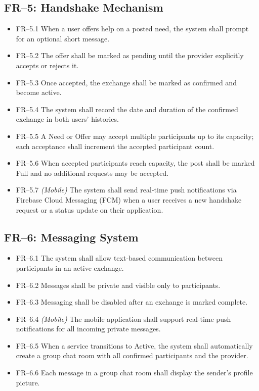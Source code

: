 \documentclass[11pt,a4paper]{report}
\begin{document}
\subsection{FR--5: Handshake Mechanism}
\begin{itemize}
    \item FR--5.1 When a user offers help on a posted need, the system shall prompt for an optional short message.
    \item FR--5.2 The offer shall be marked as pending until the provider explicitly accepts or rejects it.
    \item FR--5.3 Once accepted, the exchange shall be marked as confirmed and become active.
    \item FR--5.4 The system shall record the date and duration of the confirmed exchange in both users' histories.
    \item FR--5.5 A Need or Offer may accept multiple participants up to its capacity; each acceptance shall increment the accepted participant count.
    \item FR--5.6 When accepted participants reach capacity, the post shall be marked Full and no additional requests may be accepted.
    \item FR--5.7 \textit{(Mobile)} The system shall send real-time push notifications via Firebase Cloud Messaging (FCM) when a user receives a new handshake request or a status update on their application.
\end{itemize}

\subsection{FR--6: Messaging System}
\begin{itemize}
    \item FR--6.1 The system shall allow text-based communication between participants in an active exchange.
    \item FR--6.2 Messages shall be private and visible only to participants.
    \item FR--6.3 Messaging shall be disabled after an exchange is marked complete.
    \item FR--6.4 \textit{(Mobile)} The mobile application shall support real-time push notifications for all incoming private messages.
    \item FR--6.5 When a service transitions to Active, the system shall automatically create a group chat room with all confirmed participants and the provider.
    \item FR--6.6 Each message in a group chat room shall display the sender's profile picture.
\end{itemize}
\end{document}
